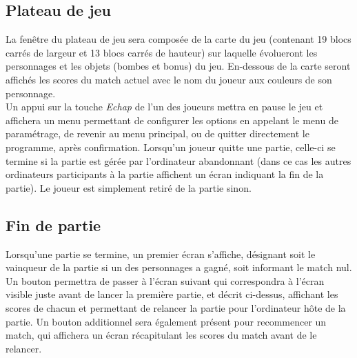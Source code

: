 \subsection{Plateau de jeu}

La fenêtre du plateau de jeu sera composée de la carte du jeu (contenant 19 blocs carrés de largeur et 13 blocs carrés de hauteur) sur laquelle évolueront les personnages et les objets (bombes et bonus) du jeu. En-dessous de la carte seront affichés les scores du match actuel avec le nom du joueur aux couleurs de son personnage.\\

Un appui sur la touche \emph{Echap} de l'un des joueurs mettra en pause le jeu et affichera un menu permettant de configurer les options en appelant le menu de paramétrage, de revenir au menu principal, ou de quitter directement le programme, après confirmation. Lorsqu'un joueur quitte une partie, celle-ci se termine si la partie est gérée par l'ordinateur abandonnant (dans ce cas les autres ordinateurs participants à la partie affichent un écran indiquant la fin de la partie). Le joueur est simplement retiré de la partie sinon.

\subsection{Fin de partie}

Lorsqu'une partie se termine, un premier écran s'affiche, désignant soit le vainqueur de la partie si un des personnages a gagné, soit informant le match nul. Un bouton permettra de passer à l'écran suivant qui correspondra à l'écran visible juste avant de lancer la première partie, et décrit ci-dessus, affichant les scores de chacun et permettant de relancer la partie pour l'ordinateur hôte de la partie. Un bouton additionnel sera également présent pour recommencer un match, qui affichera un écran récapitulant les scores du match avant de le relancer.